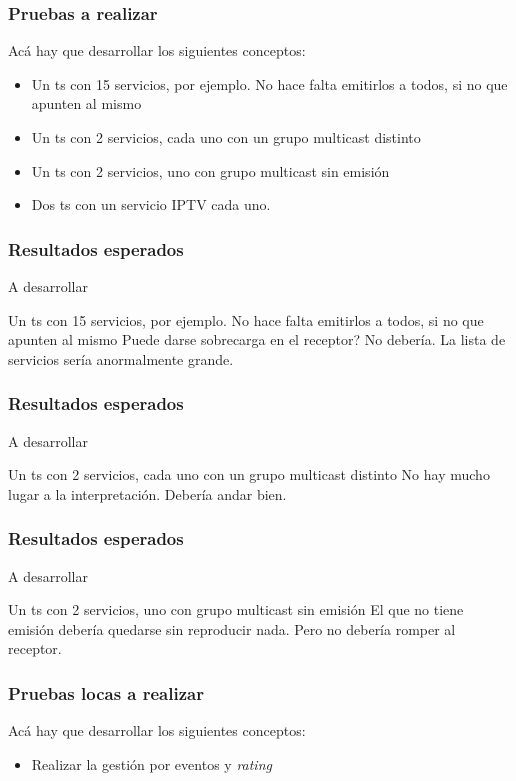 \documentclass[a4paper,11pt]{beamer}
\begin{document}
\begin{frame}
\frametitle{Pruebas a realizar}
Acá hay que desarrollar los siguientes conceptos:
\begin{itemize}
\item Un ts con 15 servicios, por ejemplo. No hace falta emitirlos a todos, si no que apunten al mismo
\item Un ts con 2 servicios, cada uno con un grupo multicast distinto
\item Un ts con 2 servicios, uno con grupo multicast sin emisión
\item Dos ts con un servicio IPTV cada uno.
\end{itemize}
\end{frame}

\begin{frame}
\frametitle{Resultados esperados}
A desarrollar

Un ts con 15 servicios, por ejemplo. No hace falta emitirlos a todos, si no que apunten al mismo
Puede darse sobrecarga en el receptor? No debería. La lista de servicios sería anormalmente grande.
\end{frame}

\begin{frame}
\frametitle{Resultados esperados}
A desarrollar

Un ts con 2 servicios, cada uno con un grupo multicast distinto
No hay mucho lugar a la interpretación. Debería andar bien.
\end{frame}

\begin{frame}
\frametitle{Resultados esperados}
A desarrollar

Un ts con 2 servicios, uno con grupo multicast sin emisión
El que no tiene emisión debería quedarse sin reproducir nada. Pero no debería romper al receptor.
\end{frame}



\begin{frame}
\frametitle{Pruebas locas a realizar}
Acá hay que desarrollar los siguientes conceptos:
\begin{itemize}
\item Realizar la gestión por eventos y \emph{rating}

\end{itemize}
\end{frame}
\end{document}
